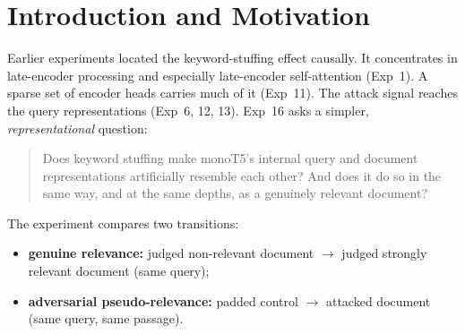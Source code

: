 \documentclass[11pt]{article}
\begin{document}
\begin{abstract}
\emph{not} reproduce the genuine-relevance similarity signature. Only the minority of
attacks that actually work move the final-layer similarity in the relevant direction,
and even they do so by a fraction of the genuine gap. \textbf{Supplementary level
analyses} split the attacks by example-level success. They cover the 25 encoder
checkpoints, the 18 important encoder heads, all 36 heads of encoder layers 9--11, the
decoder cross-attention and residual
stream, and the 31 important decoder heads. At every one of these levels,
\emph{successful} attacked inputs look like clean \emph{non-relevant} documents, not like
genuinely relevant ones, and they are no closer to genuine relevance than unsuccessful
attacks. \textbf{A simple anomaly detector} counts heads whose similarity deviates
($|z|>2$) from genuine relevant inputs, with held-out queries. Successful attacks
activate more abnormal heads (median 4 vs 1; AUROC 0.74, 0.78 with the top 5 heads).
The signal is sparse, almost always ``too low'', and concentrated in heads that overlap
strongly with the causally important ones (\texttt{L11H11}, \texttt{L10H2},
\texttt{L10H0}). None of this is causal evidence.
\end{abstract}

\tableofcontents

\section{Introduction and Motivation}

Earlier experiments located the keyword-stuffing effect causally. It concentrates in
late-encoder processing and especially late-encoder self-attention (Exp~1). A sparse
set of encoder heads carries much of it (Exp~11). The attack signal reaches the query
representations (Exp~6, 12, 13). Exp~16 asks a simpler, \emph{representational}
question:

\begin{quote}
Does keyword stuffing make monoT5's internal query and document representations
artificially resemble each other? And does it do so in the same way, and at the same
depths, as a genuinely relevant document?
\end{quote}

The experiment compares two transitions:

\begin{itemize}[nosep]
  \item \textbf{genuine relevance:} judged non-relevant document $\to$ judged strongly
        relevant document (same query);
  \item \textbf{adversarial pseudo-relevance:} padded control $\to$ attacked document
        (same query, same passage).
\end{itemize}
\end{document}
